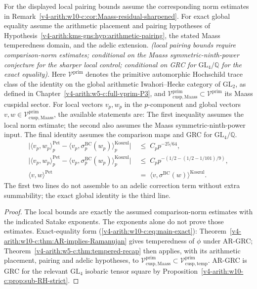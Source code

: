 \begin{theorem}
\label{v4-arith:w10-c:thm:main}
For the displayed local pairing bounds assume the corresponding
norm estimates in Remark~\ref{v4-arith:w10-c:cor:Maass-residual-sharpened}.
For exact global equality assume the arithmetic placement and pairing
hypotheses of Hypothesis~\ref{v4-arith:kms-gns:hyp:arithmetic-pairing},
the stated Maass temperedness domain, and the adelic extension.
\emph{(local pairing bounds require comparison-norm estimates; conditional on the Maass symmetric-ninth-power
conjecture for the sharper local control; conditional on GRC for
\(\mathrm{GL}_{4}/\mathbb{Q}\) for the exact equality)}.
Here \(\mathcal{V}^{\mathrm{prim}}\) denotes the primitive automorphic
Hochschild trace class of the identity on the global arithmetic
Iwahori--Hecke category of \(\mathrm{GL}_{2}\), as defined in
Chapter~\ref{v4-arith:w5-c:full-vprim-P3}, and
\(\mathcal{V}^{\mathrm{prim}}_{\mathrm{cusp,Maass}}\subset
\mathcal{V}^{\mathrm{prim}}\) its Maass cuspidal sector.
For local vectors \(v_{p},w_{p}\) in the \(p\)-component and global
vectors \(v,w\in\mathcal{V}^{\mathrm{prim}}_{\mathrm{cusp,Maass}}\), the
available statements are:
The first inequality assumes the local norm estimate; the second also
assumes the Maass symmetric-ninth-power input. The final identity
assumes the comparison maps and GRC for \(\mathrm{GL}_4/\mathbb Q\).
\begin{align}
\label{v4-arith:w10-c:eq:main-KS}
\bigl|\langle v_{p},w_{p}\rangle^{\mathrm{Pet}}_{p}
-\langle v_{p},\sigma^{\mathrm{BC}}_{p}(w_{p})\rangle^{\mathrm{Koszul}}_{p}\bigr|
&\;\leq\;C_{p}p^{-25/64},
\\
\label{v4-arith:w10-c:eq:main-error}
\bigl|\langle v_{p},w_{p}\rangle^{\mathrm{Pet}}_{p}
-\langle v_{p},\sigma^{\mathrm{BC}}_{p}(w_{p})\rangle^{\mathrm{Koszul}}_{p}\bigr|
&\;\leq\;C_{p}p^{-(1/2-(1/2-1/101)/9)},
\\
\label{v4-arith:w10-c:eq:main-exact}
\langle v,w\rangle^{\mathrm{Pet}}
&\;=\;\langle v,\sigma^{\mathrm{BC}}(w)\rangle^{\mathrm{Koszul}}.
\end{align}
The first two lines do not assemble to an adelic correction term without
extra summability; the exact global identity is the third line.
\end{theorem}

\begin{proof}
The local bounds are exactly the assumed comparison-norm estimates
with the indicated Satake exponents. The exponents alone do not
prove those estimates.
Exact-equality form (\ref{v4-arith:w10-c:eq:main-exact}):
Theorem~\ref{v4-arith:w10-c:thm:AR-implies-Ramanujan} gives temperedness of
\(\phi\) under AR-GRC; Theorem~\ref{v4-arith:w5-c:thm:tempered-recap} then
applies, with its arithmetic placement, pairing and adelic
hypotheses, to \(\mathcal{V}^{\mathrm{prim}}_{\mathrm{cusp,Maass}}\subset
\mathcal{V}^{\mathrm{prim}}_{\mathrm{cusp,temp}}\). AR-GRC is
GRC for the relevant \(\mathrm{GL}_{4}\) isobaric tensor square by
Proposition~\ref{v4-arith:w10-c:prop:sub-RH-strict}.
\end{proof}

